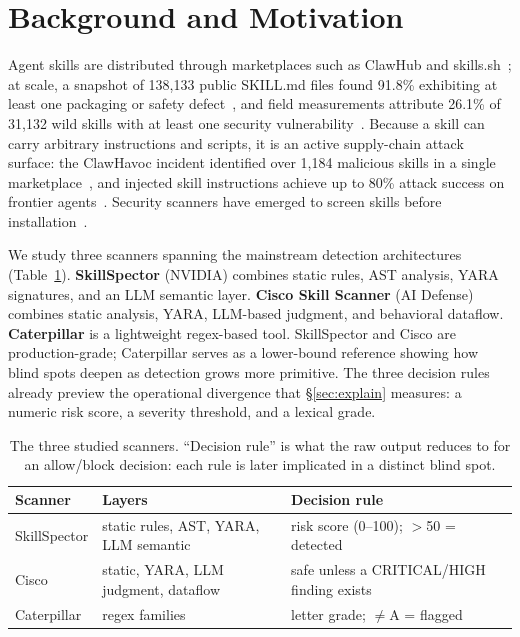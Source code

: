 \documentclass[sigconf,nonacm]{acmart}
\begin{document}
\section{Background and Motivation}
\label{sec:background}

Agent skills are distributed through marketplaces such as ClawHub and skills.sh~\cite{clawhub2026}; at scale, a snapshot of 138{,}133 public SKILL.md files found 91.8\% exhibiting at least one packaging or safety defect~\cite{reusability2026}, and field measurements attribute 26.1\% of 31{,}132 wild skills with at least one security vulnerability~\cite{skillscan2026}. Because a skill can carry arbitrary instructions and scripts, it is an active supply-chain attack surface: the ClawHavoc incident identified over 1{,}184 malicious skills in a single marketplace~\cite{clawhub2026}, and injected skill instructions achieve up to 80\% attack success on frontier agents~\cite{skillinject2026}. Security scanners have emerged to screen skills before installation~\cite{locatejudge2026}.

We study three scanners spanning the mainstream detection architectures (Table~\ref{tab:scanners}). \textbf{SkillSpector} (NVIDIA) combines static rules, AST analysis, YARA signatures, and an LLM semantic layer. \textbf{Cisco Skill Scanner} (AI Defense) combines static analysis, YARA, LLM-based judgment, and behavioral dataflow. \textbf{Caterpillar} is a lightweight regex-based tool. SkillSpector and Cisco are production-grade; Caterpillar serves as a lower-bound reference showing how blind spots deepen as detection grows more primitive. The three decision rules already preview the operational divergence that \S\ref{sec:explain} measures: a numeric risk score, a severity threshold, and a lexical grade.

\begin{table}[t]
\caption{The three studied scanners. ``Decision rule'' is what the raw output reduces to for an allow/block decision: each rule is later implicated in a distinct blind spot.}
\label{tab:scanners}
\small
\begin{tabular}{@{}p{1.5cm}p{2.6cm}p{3.6cm}@{}}
\toprule
Scanner & Layers & Decision rule \\
\midrule
SkillSpector & static rules, AST, YARA, LLM semantic & risk score (0--100); $>$50 = detected \\
Cisco & static, YARA, LLM judgment, dataflow & safe unless a CRITICAL/HIGH finding exists \\
Caterpillar & regex families & letter grade; $\neq$A = flagged \\
\bottomrule
\end{tabular}
\end{table}
\end{document}
